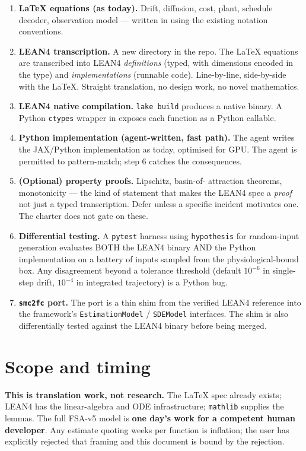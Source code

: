 \documentclass[11pt,a4paper]{article}
\begin{document}
\begin{enumerate}
\item \textbf{LaTeX equations (as today).} Drift, diffusion, cost,
  plant, schedule decoder, observation model --- written in
   using the existing notation
  conventions.
\item \textbf{LEAN4 transcription.} A new  directory in
  the repo. The LaTeX equations are transcribed into LEAN4
  \emph{definitions} (typed, with dimensions encoded in the type)
  and \emph{implementations} (runnable code). Line-by-line,
  side-by-side with the LaTeX. Straight translation, no design
  work, no novel mathematics.
\item \textbf{LEAN4 native compilation.} \texttt{lake build}
  produces a native binary. A Python \texttt{ctypes} wrapper in
   exposes each function as a Python
  callable.
\item \textbf{Python implementation (agent-written, fast path).}
  The agent writes the JAX/Python implementation as today,
  optimised for GPU. The agent is permitted to pattern-match;
  step 6 catches the consequences.
\item \textbf{(Optional) property proofs.} Lipschitz, basin-of-
  attraction theorems, monotonicity --- the kind of statement that
  makes the LEAN4 spec a \emph{proof} not just a typed transcription.
  Defer unless a specific incident motivates one. The charter does
  not gate on these.
\item \textbf{Differential testing.} A \texttt{pytest} harness using
  \texttt{hypothesis} for random-input generation evaluates BOTH the
  LEAN4 binary AND the Python implementation on a battery of inputs
  sampled from the physiological-bound box. Any disagreement beyond
  a tolerance threshold (default $10^{-6}$ in single-step drift,
  $10^{-4}$ in integrated trajectory) is a Python bug.
\item \textbf{\texttt{smc2fc} port.} The port is a thin shim from
  the verified LEAN4 reference into the framework's
  \texttt{EstimationModel} / \texttt{SDEModel} interfaces. The
  shim is also differentially tested against the LEAN4 binary
  before being merged.
\end{enumerate}

\section{Scope and timing}
\label{sec:scope}

\textbf{This is translation work, not research.} The LaTeX spec
already exists; LEAN4 has the linear-algebra and ODE infrastructure;
\texttt{mathlib} supplies the lemmas. The full FSA-v5 model is
\textbf{one day's work for a competent human developer}. Any
estimate quoting weeks per function is inflation; the user has
explicitly rejected that framing and this document is bound by the
rejection.
\end{document}

